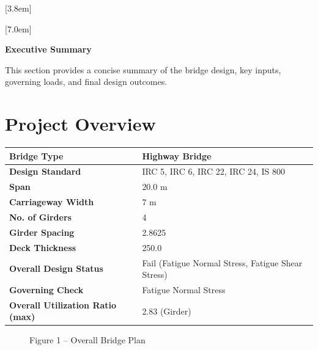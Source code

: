 \documentclass[12pt,a4paper]{report}
\numberwithin{table}{chapter}
\numberwithin{figure}{chapter}
\begin{document}
[3.8em]
  {\normalfont}
  {\contentslabel{2.3em}}
  {\hspace*{-2.3em}}
  {\hfill\contentspage}

[7.0em]
  {\normalfont}
  {\contentslabel{3.2em}}
  {\hspace*{-3.2em}}
  {\hfill\contentspage}

\newpage
\renewcommand{\contentsname}{\centering\Large\bfseries Table of Contents}
\tableofcontents


\newpage
{\centering\Large\bfseries Executive Summary\par}
\vspace{0.8em}

This section provides a concise summary of the bridge design, key inputs, governing loads, and final design outcomes.

\section*{Project Overview}
\label{sec:project-overview}


\begin{tabular}{|L{5.5cm}|L{8.5cm}|}
\hline
\textbf{Bridge Type} & Highway Bridge \\
\hline
\textbf{Design Standard} & IRC 5, IRC 6, IRC 22, IRC 24, IS 800 \\
\hline
\textbf{Span} & 20.0 m \\
\hline
\textbf{Carriageway Width} & 7 m \\
\hline
\textbf{No. of Girders} & 4 \\
\hline
\textbf{Girder Spacing} & 2.8625 \\
\hline
\textbf{Deck Thickness} & 250.0 \\
\hline
\textbf{Overall Design Status} & Fail (Fatigue Normal Stress, Fatigue Shear Stress) \\
\hline
\textbf{Governing Check} & Fatigue Normal Stress \\
\hline
\textbf{Overall Utilization Ratio (max)} & 2.83 (Girder) \\
\hline
\end{tabular}


\begin{figure}[H]
\centering
{}
\caption*{Figure 1 -- Overall Bridge Plan}
\end{figure}
\end{document}
